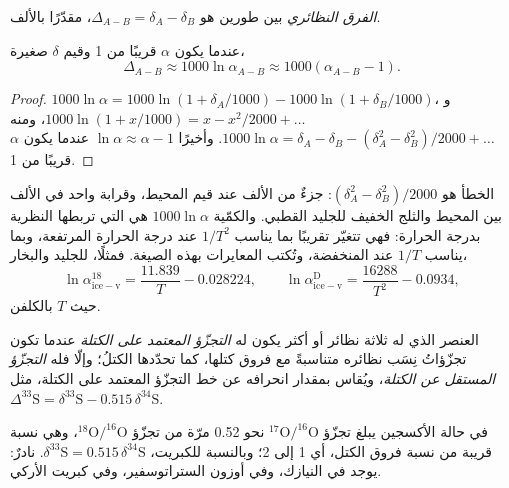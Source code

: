 \begin{definition}\label{def:b3:stable-isotopes:big-delta}
\emph{الفرق النظائري}
بين طورين هو $\Delta_{A-B} = \delta_A - \delta_B$، مقدّرًا بالألف.
\end{definition}

\begin{proposition}
\label{prop:b3:stable-isotopes:big-delta}
عندما يكون $\alpha$ قريبًا من 1 وقيم $\delta$ صغيرة،
\[
\Delta_{A-B} \approx 1000\ln\alpha_{A-B} \approx 1000(\alpha_{A-B} - 1).
\]
\end{proposition}

\begin{proof}
$1000\ln\alpha = 1000\ln(1 + \delta_A/1000) - 1000\ln(1 + \delta_B/1000)$،
و$1000\ln(1 + x/1000) = x - x^2/2000 + \dots$، ومنه $1000\ln\alpha = \delta_A -
\delta_B - (\delta_A^2 - \delta_B^2)/2000 + \dots$. وأخيرًا $\ln\alpha \approx
\alpha - 1$ عندما يكون $\alpha$ قريبًا من 1.
\end{proof}

الخطأ هو $(\delta_A^2 - \delta_B^2)/2000$: جزءٌ من الألف عند
قيم المحيط، وقرابة واحد في الألف بين المحيط والثلج الخفيف
للجليد القطبي.
والكمّية $1000\ln\alpha$ هي التي تربطها النظرية بدرجة الحرارة: فهي
تتغيّر تقريبًا بما يناسب $1/T^2$ عند درجة الحرارة المرتفعة، وبما يناسب $1/T$ عند المنخفضة،
وتُكتب المعايرات بهذه الصيغة. فمثلًا، للجليد والبخار،
\[
\ln\alpha^{18}_{\mathrm{ice-v}} = \frac{11.839}{T} - 0.028224, \qquad
\ln\alpha^{\mathrm D}_{\mathrm{ice-v}} = \frac{16288}{T^2} - 0.0934,
\]
حيث $T$ بالكلفن.

\begin{definition}\label{def:b3:stable-isotopes:mif}
العنصر الذي له ثلاثة نظائر أو أكثر يكون له \emph{التجزّؤ المعتمد
على الكتلة} عندما تكون تجزّؤاتُ
نِسَب نظائره متناسبةً مع فروق كتلها، كما تحدّدها
الكتلُ؛ وإلّا فله \emph{التجزّؤ المستقل
عن الكتلة}، ويُقاس بمقدار انحرافه
عن خط التجزّؤ المعتمد على الكتلة، مثل $\Delta^{33}\mathrm S = \delta^{33}\mathrm S
- 0.515\,\delta^{34}\mathrm S$.
\end{definition}

في حالة الأكسجين يبلغ تجزّؤ $^{17}\mathrm O/^{16}\mathrm O$ نحو 0.52 مرّة من
تجزّؤ $^{18}\mathrm O/^{16}\mathrm O$، وهي نسبة قريبة من نسبة فروق الكتل، أي 1 إلى 2؛
وبالنسبة للكبريت، $\delta^{33}\mathrm S = 0.515\,\delta^{34}\mathrm S$.  نادرٌ: يوجد في النيازك، وفي أوزون الستراتوسفير،
وفي كبريت الأركي.

